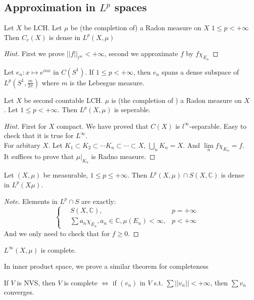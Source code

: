 \subsection{Approximation in  $ L^p $ spaces}
\begin{theorem}
    Let  $ X  $ be LCH. Let  $ \mu  $ be (the completion of) a Radon measure on   $ X  $   $ 1 \leq p  < +\infty $ Then  $ C_c(X)  $ is dense in  $ L^p(X,\mu) $  
\end{theorem}
\begin{proof}[Hint]
    First we prove  $ ||f||_{l^\infty}<+\infty $, second we approximate  $ f  $ by  $ f\chi_{E_n} $  
\end{proof}
\begin{corollary}
    Let  $ e_n: x\mapsto e^{inx} $ in  $ C(S^1) $. If  $ 1 \leq p<+\infty $, then  $ e_n  $ spans a dense subspace of  $ L^p(S^1,\frac{m}{2\pi}) $ where  $ m  $ is the Lebesgue measure.  
\end{corollary}
\begin{theorem}
    Let  $ X  $ be second countable LCH.  $ \mu  $ is (the completion of ) a Radon measure on  $ X  $. Let  $ 1 \leq p<+\infty $. Then  $ L^p(X,\mu ) $ is seperable. 
\end{theorem}
\begin{proof}[Hint]
    First for  $ X  $ compact. We have proved that  $ C(X)  $ is  $ l^\infty  $-separable. Easy to check that it is true for  $ L^\infty $.\\
    For arbitary  $ X  $. Let  $ K_1\subset K_2\subset\cdots K_n\subset\cdots\subset X $,  $ \bigcup\limits_n K_n=X $. And  $ \lim\limits_n f\chi_{K_n}=f $. It suffices to prove that  $ \mu|_{K_n} $ is Radno measure.
\end{proof}
\begin{theorem}
    Let  $ (X,\mu ) $ be measurable,  $ 1 \leq p \leq+\infty $. Then  $ L^p(X,\mu)\cap S(X,\mathbb{C}) $ is dense in  $ L^p(X\mu) $.   
\end{theorem}
\begin{proof}[Note]
    Elements in  $ L^p\cap S $ are exactly: 
    \begin{equation*}
        \left\{
            \begin{aligned}
                \,{}&S(X,\mathbb{C}), {}&p=+\infty\\
                \,{}&\sum a_n\chi_{E_n},a_n\in \mathbb{C},\mu(E_n)<\infty,{}&p<+\infty
            \end{aligned}
        \right.
    \end{equation*}
    And we only need to check that for  $ f \geq 0 $. 
\end{proof}
\begin{proposition}
     $ L^\infty(X,\mu) $ is complete. 
\end{proposition}
In inner product space, we prove a similar theorem for completeness
\begin{theorem}
    If  $ V  $ is NVS, then  $ V  $ is complete  $ \Leftrightarrow  $ if  $ (v_n) $ in  $ V  $ s.t.  $ \sum ||v_n||<+\infty $, then  $ \sum v_n  $ converges. 
\end{theorem}
